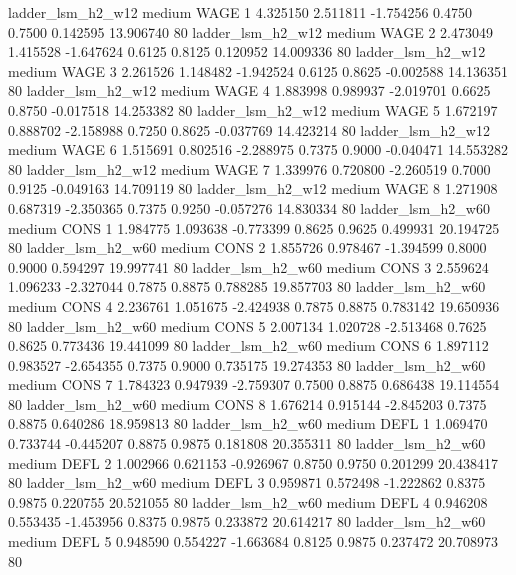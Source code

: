      ladder_lsm_h2_w12     medium     WAGE                 1  4.325150 2.511811 -1.754256 0.4750 0.7500  0.142595   13.906740 80
     ladder_lsm_h2_w12     medium     WAGE                 2  2.473049 1.415528 -1.647624 0.6125 0.8125  0.120952   14.009336 80
     ladder_lsm_h2_w12     medium     WAGE                 3  2.261526 1.148482 -1.942524 0.6125 0.8625 -0.002588   14.136351 80
     ladder_lsm_h2_w12     medium     WAGE                 4  1.883998 0.989937 -2.019701 0.6625 0.8750 -0.017518   14.253382 80
     ladder_lsm_h2_w12     medium     WAGE                 5  1.672197 0.888702 -2.158988 0.7250 0.8625 -0.037769   14.423214 80
     ladder_lsm_h2_w12     medium     WAGE                 6  1.515691 0.802516 -2.288975 0.7375 0.9000 -0.040471   14.553282 80
     ladder_lsm_h2_w12     medium     WAGE                 7  1.339976 0.720800 -2.260519 0.7000 0.9125 -0.049163   14.709119 80
     ladder_lsm_h2_w12     medium     WAGE                 8  1.271908 0.687319 -2.350365 0.7375 0.9250 -0.057276   14.830334 80
     ladder_lsm_h2_w60     medium     CONS                 1  1.984775 1.093638 -0.773399 0.8625 0.9625  0.499931   20.194725 80
     ladder_lsm_h2_w60     medium     CONS                 2  1.855726 0.978467 -1.394599 0.8000 0.9000  0.594297   19.997741 80
     ladder_lsm_h2_w60     medium     CONS                 3  2.559624 1.096233 -2.327044 0.7875 0.8875  0.788285   19.857703 80
     ladder_lsm_h2_w60     medium     CONS                 4  2.236761 1.051675 -2.424938 0.7875 0.8875  0.783142   19.650936 80
     ladder_lsm_h2_w60     medium     CONS                 5  2.007134 1.020728 -2.513468 0.7625 0.8625  0.773436   19.441099 80
     ladder_lsm_h2_w60     medium     CONS                 6  1.897112 0.983527 -2.654355 0.7375 0.9000  0.735175   19.274353 80
     ladder_lsm_h2_w60     medium     CONS                 7  1.784323 0.947939 -2.759307 0.7500 0.8875  0.686438   19.114554 80
     ladder_lsm_h2_w60     medium     CONS                 8  1.676214 0.915144 -2.845203 0.7375 0.8875  0.640286   18.959813 80
     ladder_lsm_h2_w60     medium     DEFL                 1  1.069470 0.733744 -0.445207 0.8875 0.9875  0.181808   20.355311 80
     ladder_lsm_h2_w60     medium     DEFL                 2  1.002966 0.621153 -0.926967 0.8750 0.9750  0.201299   20.438417 80
     ladder_lsm_h2_w60     medium     DEFL                 3  0.959871 0.572498 -1.222862 0.8375 0.9875  0.220755   20.521055 80
     ladder_lsm_h2_w60     medium     DEFL                 4  0.946208 0.553435 -1.453956 0.8375 0.9875  0.233872   20.614217 80
     ladder_lsm_h2_w60     medium     DEFL                 5  0.948590 0.554227 -1.663684 0.8125 0.9875  0.237472   20.708973 80
